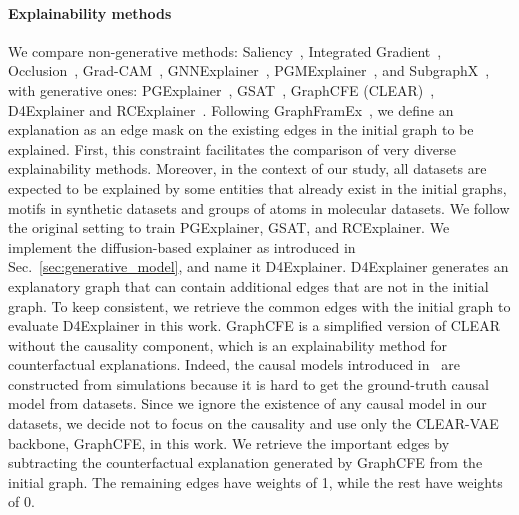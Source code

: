 \paragraph{Explainability methods} We compare non-generative methods: Saliency~\cite{SA-Graph}, Integrated Gradient~\cite{IG}, Occlusion~\cite{occlusion}, Grad-CAM~\cite{Grad-CAM-Graph}, GNNExplainer~\cite{GNNExplainer}, PGMExplainer~\cite{PGM-Explainer}, and SubgraphX~\cite{SubgraphX}, with generative ones: PGExplainer~\cite{PGExplainer}, GSAT~\cite{GSAT}, GraphCFE (CLEAR)~\cite{CLEAR}, D4Explainer and RCExplainer~\cite{RCExplainer}. Following GraphFramEx~\cite{GraphFramEx}, we define an explanation as an edge mask on the existing edges in the initial graph to be explained. First, this constraint facilitates the comparison of very diverse explainability methods. Moreover, in the context of our study, all datasets are expected to be explained by some entities that already exist in the initial graphs, \ie motifs in synthetic datasets and groups of atoms in molecular datasets. We follow the original setting to train PGExplainer, GSAT, and RCExplainer. We implement the diffusion-based explainer as introduced in Sec.~\ref{sec:generative_model}, and name it D4Explainer. D4Explainer generates an explanatory graph that can contain additional edges that are not in the initial graph. To keep consistent, we retrieve the common edges with the initial graph to evaluate D4Explainer in this work. GraphCFE is a simplified version of CLEAR~\cite{CLEAR} without the causality component, which is an explainability method for counterfactual explanations. Indeed, the causal models introduced in~\cite{CLEAR} are constructed from simulations because it is hard to get the ground-truth causal model from datasets. Since we ignore the existence of any causal model in our datasets, we decide not to focus on the causality and use only the CLEAR-VAE backbone, \ie GraphCFE, in this work. We retrieve the important edges by subtracting the counterfactual explanation generated by GraphCFE from the initial graph. The remaining edges have weights of 1, while the rest have weights of 0.



